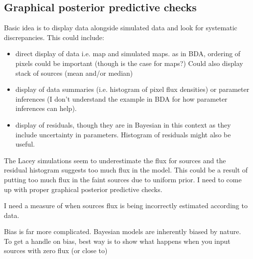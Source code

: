 \documentclass[a4paper,11pt]{article}
\begin{document}
\subsection{Graphical posterior predictive checks}
Basic idea is to display data alongside simulated data and look for systematic discrepancies. This could include:
\begin{itemize}
\item direct display of data i.e. map and simulated maps. as in BDA, ordering of pixels could be important (though is the case for maps?) Could also display stack of sources (mean and/or median)
\item display of data summaries (i.e. histogram of pixel flux densities) or parameter inferences (I don't understand the example in BDA for how parameter inferences can help).
\item display of residuals, though they are in Bayesian in this context as they include uncertainty in parameters. Histogram of residuals might also be useful.
\end{itemize}

The Lacey simulations seem to underestimate the flux for sources and the residual histogram suggests too much flux in the model. This could be a result of putting too much flux in the faint sources due to uniform prior. I need to come up with proper graphical posterior predictive checks. 


I need a measure of when sources flux is being incorrectly estimated according to data. 

Bias is far more complicated. Bayesian models are inherently biased by nature. To get a handle on bias, best way is to show what happens when you input sources with zero flux (or close to) 
 
\end{document}
